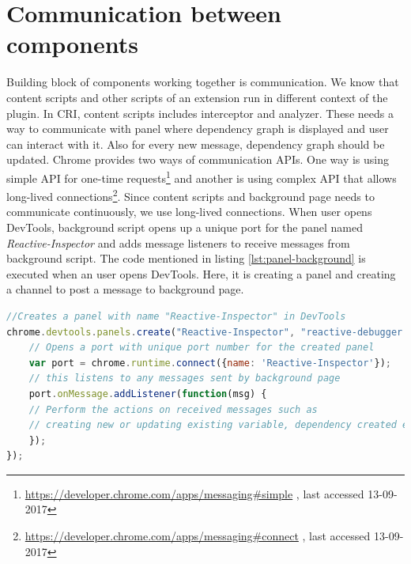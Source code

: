 \section{Communication between components}
Building block of components working together is communication. We know that content scripts and other scripts of an extension run in different context of the plugin. In CRI, content scripts includes interceptor and analyzer. These needs a way to communicate with panel where dependency graph is displayed and user can interact with it. Also for every new message, dependency graph should be updated. Chrome provides two ways of communication APIs.  One way is using simple API for one-time requests\footnote{\url{https://developer.chrome.com/apps/messaging\#simple} , last accessed 13-09-2017} and another is using complex API that allows long-lived connections\footnote{\url{https://developer.chrome.com/apps/messaging\#connect} , last accessed 13-09-2017}. Since content scripts and background page needs to communicate continuously, we use long-lived connections. When user opens DevTools, background script opens up a unique port for the panel named \textit{Reactive-Inspector} and adds message listeners to receive messages from background script. The code mentioned in listing \ref{lst:panel-background} is executed when an user opens DevTools. Here, it is creating a panel and creating a channel to post a message to background page.

\begin{lstlisting}[language=JavaScript, caption=Creating a channel for communication between Panel and Background pages, label={lst:panel-background}]
//Creates a panel with name "Reactive-Inspector" in DevTools
chrome.devtools.panels.create("Reactive-Inspector", "reactive-debugger.png", "panel.html", function (extensionPanel) {
	// Opens a port with unique port number for the created panel
	var port = chrome.runtime.connect({name: 'Reactive-Inspector'});
	// this listens to any messages sent by background page
	port.onMessage.addListener(function(msg) {
	// Perform the actions on received messages such as
	// creating new or updating existing variable, dependency created etc.
	});
});

\end{lstlisting}

